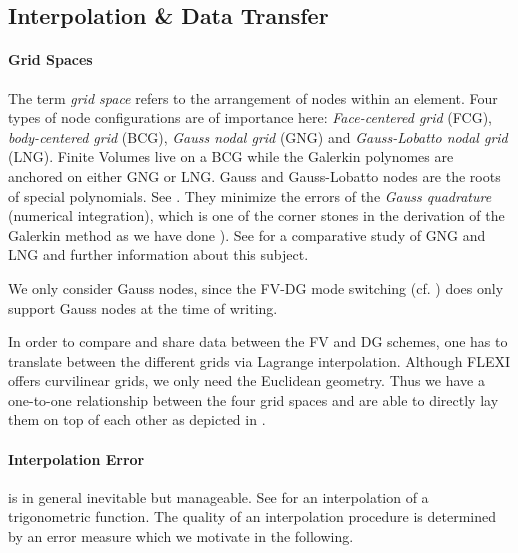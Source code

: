 \subsection{Interpolation \& Data Transfer}
\label{sec:trafo}

\paragraph{Grid Spaces}
The term \emph{grid space} refers to the arrangement of nodes within an
element. Four types of node configurations are of importance here:
\emph{Face-centered grid} (FCG), \emph{body-centered grid} (BCG), \emph{Gauss
nodal grid} (GNG) and \emph{Gauss-Lobatto nodal grid} (LNG). Finite Volumes
live on a BCG while the Galerkin polynomes are anchored on either GNG or LNG.
Gauss and Gauss-Lobatto nodes are the roots of special polynomials. See
. They minimize the errors of the \emph{Gauss quadrature}
(numerical integration), which is one of the corner stones in the derivation of
the Galerkin method as we have done ). See
\cite{gassner2011comparison} for a comparative study of GNG and LNG and further
information about this subject.


We only consider Gauss nodes, since the FV-DG mode switching (cf.
) does only support Gauss nodes at the time of
writing.

In order to compare and share data between the FV and DG schemes, one has to
translate between the different grids via Lagrange interpolation.  Although
FLEXI offers curvilinear grids, we only need the Euclidean geometry. Thus we
have a one-to-one relationship between the four grid spaces and are able to
directly lay them on top of each other as depicted in .

\paragraph{Interpolation Error} is in general inevitable but manageable.
See  for an interpolation of a trigonometric
function. The quality of an interpolation procedure is determined by an
error measure which we motivate in the following.

